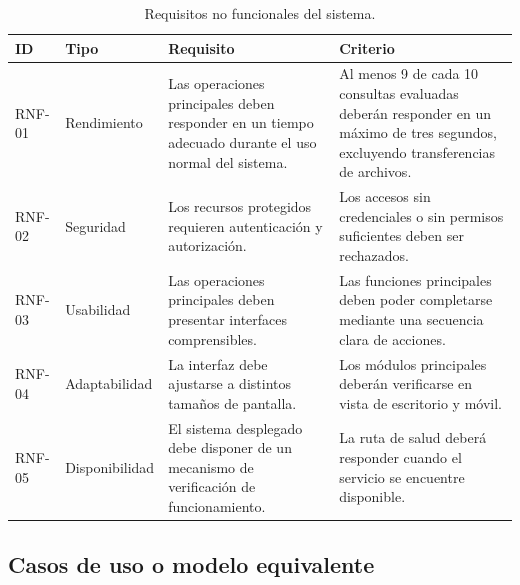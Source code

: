 \begin{table}[H]
	
	\centering
	\small
	
	\begin{tabularx}{\textwidth}
		{|L{1.4cm}|L{2.3cm}|Y|Y|}
		
		\hline
		
		\textbf{ID} &
		\textbf{Tipo} &
		\textbf{Requisito} &
		\textbf{Criterio}
		\\ \hline
		
		RNF-01 &
		Rendimiento &
		Las operaciones principales deben responder en un tiempo adecuado
		durante el uso normal del sistema. &
		Al menos 9 de cada 10 consultas evaluadas deberán responder en un
		máximo de tres segundos, excluyendo transferencias de archivos.
		\\ \hline
		
		RNF-02 &
		Seguridad &
		Los recursos protegidos requieren autenticación y autorización. &
		Los accesos sin credenciales o sin permisos suficientes deben ser
		rechazados.
		\\ \hline
		
		RNF-03 &
		Usabilidad &
		Las operaciones principales deben presentar interfaces comprensibles. &
		Las funciones principales deben poder completarse mediante una
		secuencia clara de acciones.
		\\ \hline
		
		RNF-04 &
		Adaptabilidad &
		La interfaz debe ajustarse a distintos tamaños de pantalla. &
		Los módulos principales deberán verificarse en vista de escritorio
		y móvil.
		\\ \hline
		
		RNF-05 &
		Disponibilidad &
		El sistema desplegado debe disponer de un mecanismo de verificación
		de funcionamiento. &
		La ruta de salud deberá responder cuando el servicio se encuentre
		disponible.
		\\ \hline
		
	\end{tabularx}
	
	\caption{Requisitos no funcionales del sistema.
		\fuentepropia}
	
\end{table}



\subsection{Casos de uso o modelo equivalente}



